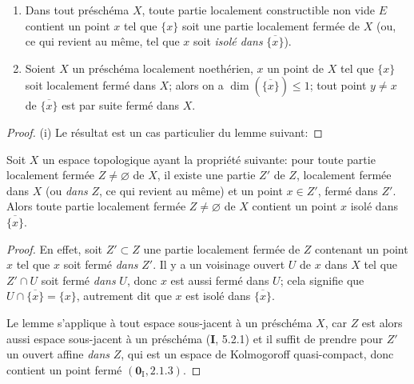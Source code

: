 \begin{proposition}[5.1.10]
\label{IV.2.5.1.10-fr}
\begin{enumerate}
\item[\textup{(i)}] Dans tout préschéma $X$, toute partie localement constructible non
vide $E$ contient un point $x$ tel que $\{x\}$ soit une partie localement
fermée de $X$ \textup{(ou, ce qui revient au même, tel que $x$ soit \emph{isolé dans}
$\overline{\{x\}}$)}.
\item[\textup{(ii)}] Soient $X$ un préschéma localement noethérien, $x$ un point de
$X$ tel que $\{x\}$ soit localement fermé dans $X$; alors on a
$\dim(\overline{\{x\}})\leq1$; tout point $y\ne x$ de
$\overline{\{x\}}$ est par suite fermé dans $X$.
\end{enumerate}
\end{proposition}

\begin{proof}
(i) Le résultat est un cas particulier du lemme suivant:
\end{proof}

\begin{lemma}[5.1.10.1]
\label{IV.2.5.1.10.1-fr}
Soit $X$ un espace topologique ayant la propriété suivante: pour toute partie
localement fermée $Z\ne\varnothing$ de $X$, il existe une partie $Z'$ de $Z$,
localement fermée dans $X$ \textup{(ou \emph{dans} $Z$, ce qui revient au même)} et un point
$x\in Z'$, fermé \textup{dans} $Z'$. Alors toute partie localement fermée
$Z\ne\varnothing$ de $X$ contient un point $x$ isolé dans
$\overline{\{x\}}$.
\end{lemma}

\begin{proof}
En effet, soit $Z'\subset Z$ une partie localement fermée de $Z$ contenant un
point $x$ tel que $x$ soit fermé \emph{dans} $Z'$. Il y a un voisinage ouvert
$U$ de $x$ dans $X$ tel que $Z'\cap U$ soit fermé \emph{dans} $U$, donc $x$ est aussi
fermé dans $U$; cela signifie que $U\cap\overline{\{x\}}=\{x\}$, autrement
dit que $x$ est isolé dans $\overline{\{x\}}$.

Le lemme s'applique à tout espace sous-jacent à un préschéma $X$, car $Z$ est
alors aussi espace sous-jacent à un préschéma (\textbf{I}, 5.2.1) et il suffit de
prendre pour $Z'$ un ouvert affine \emph{dans} $Z$, qui est un espace de Kolmogoroff
quasi-compact, donc contient un point fermé $(\mathbf{0}_{\mathrm I},2.1.3)$.
\end{proof}


